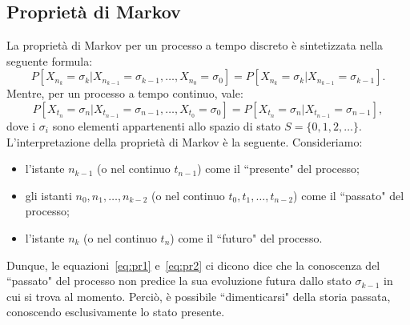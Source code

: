 \subsection{Proprietà di Markov}
La proprietà di Markov per un processo a tempo discreto \`e sintetizzata nella seguente formula:
\begin{equation}\label{eq:pr1}P[X_{n_k}=\sigma_k | X_{n_{k-1}}=\sigma_{k-1},\dots,X_{n_0}=\sigma_0]=P[X_{n_k}=\sigma_k | X_{n_{k-1}}=\sigma_{k-1}].\end{equation}
Mentre, per un processo a tempo continuo, vale:
\begin{equation}\label{eq:pr2}P[X_{t_n}=\sigma_n | X_{t_{n-1}}=\sigma_{n-1},\dots,X_{t_0}=\sigma_0]=P[X_{t_n}=\sigma_n | X_{t_{n-1}}=\sigma_{n-1}],\end{equation}
dove i $\sigma_i$ sono elementi appartenenti allo spazio di stato $S=\{0,1,2,\dots\}$.\\
L’interpretazione della proprietà di Markov \`e la seguente. Consideriamo:
\begin{itemize}
\item l'istante $n_{k-1}$ (o nel continuo $t_{n-1}$) come il ``presente" del processo;
\item gli istanti $n_0, n_1, \dots, n_{k-2}$ (o nel continuo $t_0, t_1, \dots, t_{n-2}$) come il ``passato" del processo;
\item l'istante $n_k$ (o nel continuo $t_n$) come il ``futuro" del processo.
\end{itemize}
Dunque, le equazioni~\eqref{eq:pr1} e~\eqref{eq:pr2} ci dicono dice che la conoscenza del ``passato" del processo non predice la sua evoluzione futura dallo stato $\sigma_{k-1}$ in cui si trova al momento. Perciò, \`e possibile ``dimenticarsi" della storia passata, conoscendo esclusivamente lo stato presente.
